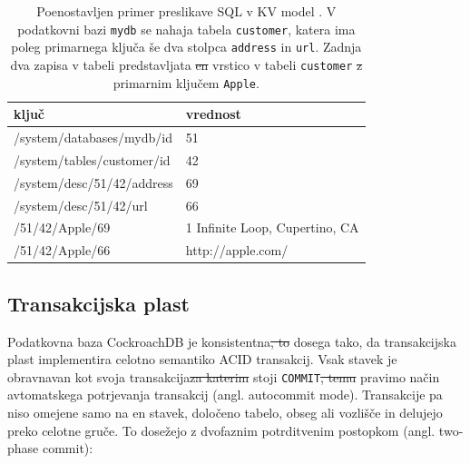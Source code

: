 \documentclass[a4paper, 12pt]{book}
\providecommand{\DIFaddtex}[1]{{\protect\color{blue}\uwave{#1}}} %
\providecommand{\DIFdeltex}[1]{{\protect\color{red}\sout{#1}}}                      %
\providecommand{\DIFaddbegin}{} %
\providecommand{\DIFaddend}{} %
\providecommand{\DIFdelbegin}{} %
\providecommand{\DIFdelend}{} %
\providecommand{\DIFaddFL}[1]{\DIFadd{#1}} %
\providecommand{\DIFdelFL}[1]{\DIFdel{#1}} %
\providecommand{\DIFaddbeginFL}{} %
\providecommand{\DIFaddendFL}{} %
\providecommand{\DIFdelbeginFL}{} %
\providecommand{\DIFdelendFL}{} %
\providecommand{\DIFadd}[1]{\texorpdfstring{\DIFaddtex{#1}}{#1}} %
\providecommand{\DIFdel}[1]{\texorpdfstring{\DIFdeltex{#1}}{}} %
\newcommand{\DIFscaledelfig}{0.5}
\newlength{\DIFdelgraphicswidth} %
\newlength{\DIFdelgraphicsheight} %
\newcommand{\DIFaddincludegraphics}[2][]{{\color{blue}\fbox{\DIFOincludegraphics[#1]{#2}}}} %
\newcommand{\DIFdelincludegraphics}[2][]{%
\sbox{\DIFdelgraphicsbox}{\DIFOincludegraphics[#1]{#2}}%
\settoboxwidth{\DIFdelgraphicswidth}{\DIFdelgraphicsbox} %
\settoboxtotalheight{\DIFdelgraphicsheight}{\DIFdelgraphicsbox} %
\scalebox{\DIFscaledelfig}{%
\parbox[b]{\DIFdelgraphicswidth}{\usebox{\DIFdelgraphicsbox}\\[-\baselineskip] \rule{\DIFdelgraphicswidth}{0em}}\llap{\resizebox{\DIFdelgraphicswidth}{\DIFdelgraphicsheight}{%
\setlength{\unitlength}{\DIFdelgraphicswidth}%
\begin{picture}(1,1)%
\thicklines\linethickness{2pt} %
{\color[rgb]{1,0,0}\put(0,0){\framebox(1,1){}}}%
{\color[rgb]{1,0,0}\put(0,0){\line( 1,1){1}}}%
{\color[rgb]{1,0,0}\put(0,1){\line(1,-1){1}}}%
\end{picture}%
}\hspace*{3pt}}} %
} %
\DeclareRobustCommand{\DIFaddbegin}{\DIFOaddbegin \let\includegraphics\DIFaddincludegraphics} %
\DeclareRobustCommand{\DIFaddend}{\DIFOaddend \let\includegraphics\DIFOincludegraphics} %
\DeclareRobustCommand{\DIFdelbegin}{\DIFOdelbegin \let\includegraphics\DIFdelincludegraphics} %
\DeclareRobustCommand{\DIFdelend}{\DIFOaddend \let\includegraphics\DIFOincludegraphics} %
\DeclareRobustCommand{\DIFaddbeginFL}{\DIFOaddbeginFL \let\includegraphics\DIFaddincludegraphics} %
\DeclareRobustCommand{\DIFaddendFL}{\DIFOaddendFL \let\includegraphics\DIFOincludegraphics} %
\DeclareRobustCommand{\DIFdelbeginFL}{\DIFOdelbeginFL \let\includegraphics\DIFdelincludegraphics} %
\DeclareRobustCommand{\DIFdelendFL}{\DIFOaddendFL \let\includegraphics\DIFOincludegraphics} %
\begin{document}
\begin{table}[H]
\begin{center}
\begin{tabular}{ l|l } 
\textbf{ključ} & \textbf{vrednost} \\
\hline
/system/databases/mydb/id & 51 \\
/system/tables/customer/id & 42 \\ 
/system/desc/51/42/address & 69 \\ 
/system/desc/51/42/url & 66 \\
/51/42/Apple/69 & 1 Infinite Loop, Cupertino, CA \\
/51/42/Apple/66 & http://apple.com/ \\
\end{tabular}
\end{center}
\caption{Poenostavljen primer preslikave SQL v KV model \cite{CRDB-design}. V podatkovni bazi \texttt{mydb} se nahaja tabela \texttt{customer}, katera ima poleg primarnega ključa še dva stolpca \texttt{address} in \texttt{url}. Zadnja dva zapisa v tabeli predstavljata \DIFdelbeginFL \DIFdelFL{en }\DIFdelendFL \DIFaddbeginFL \DIFaddFL{eno }\DIFaddendFL vrstico v tabeli \texttt{customer} \DIFdelbeginFL \DIFdelFL{z }\DIFdelendFL \DIFaddbeginFL \DIFaddFL{s }\DIFaddendFL primarnim ključem \texttt{Apple}.}
\label{tbl_crdb_sql_kv_mapping}
\end{table}

\subsection{Transakcijska plast}
Podatkovna baza CockroachDB je konsistentna\DIFdelbegin \DIFdel{, to }\DIFdelend \DIFaddbegin \DIFadd{. To }\DIFaddend dosega tako, da transakcijska plast implementira celotno semantiko ACID transakcij. Vsak stavek je obravnavan kot svoja transakcija\DIFdelbegin \DIFdel{za katerim }\DIFdelend \DIFaddbegin \DIFadd{, za katero }\DIFaddend stoji \texttt{COMMIT}\DIFdelbegin \DIFdel{, temu }\DIFdelend \DIFaddbegin \DIFadd{. Temu }\DIFaddend pravimo način avtomatskega potrjevanja transakcij (angl. autocommit mode). Transakcije pa niso omejene samo na en stavek, določeno tabelo, obseg ali vozlišče in delujejo preko celotne gruče. To dosežejo z dvofaznim potrditvenim postopkom (angl. two-phase commit):
\end{document}
